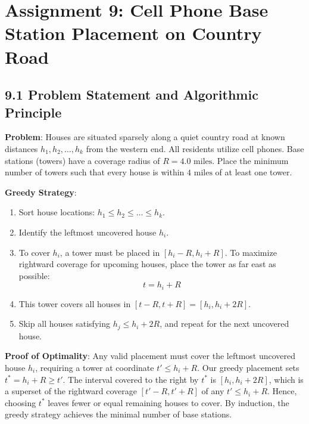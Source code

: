 \documentclass[12pt]{article}
\begin{document}
\newpage

\section*{Assignment 9: Cell Phone Base Station Placement on Country Road}

\subsection*{9.1 Problem Statement and Algorithmic Principle}
\textbf{Problem}: Houses are situated sparsely along a quiet country road at known distances $h_1, h_2, \dots, h_k$ from the western end. All residents utilize cell phones. Base stations (towers) have a coverage radius of $R = 4.0\text{ miles}$. Place the minimum number of towers such that every house is within $4\text{ miles}$ of at least one tower.

\textbf{Greedy Strategy}:
\begin{enumerate}
    \item Sort house locations: $h_1 \le h_2 \le \dots \le h_k$.
    \item Identify the leftmost uncovered house $h_i$.
    \item To cover $h_i$, a tower must be placed in $[h_i - R, h_i + R]$. To maximize rightward coverage for upcoming houses, place the tower as far east as possible:
    \[
    t = h_i + R
    \]
    \item This tower covers all houses in $[t - R, t + R] = [h_i, h_i + 2R]$.
    \item Skip all houses satisfying $h_j \le h_i + 2R$, and repeat for the next uncovered house.
\end{enumerate}

\textbf{Proof of Optimality}:
Any valid placement must cover the leftmost uncovered house $h_i$, requiring a tower at coordinate $t' \le h_i + R$. Our greedy placement sets $t^* = h_i + R \ge t'$. The interval covered to the right by $t^*$ is $[h_i, h_i + 2R]$, which is a superset of the rightward coverage $[t' - R, t' + R]$ of any $t' \le h_i + R$. Hence, choosing $t^*$ leaves fewer or equal remaining houses to cover. By induction, the greedy strategy achieves the minimal number of base stations.
\end{document}
